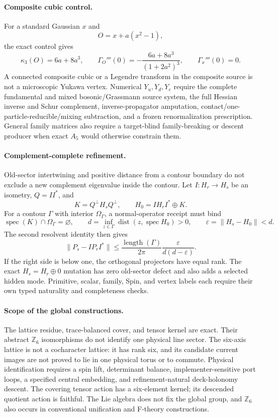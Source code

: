 \documentclass[11pt]{article}
\begin{document}
\paragraph{Composite cubic control.}
For a standard Gaussian \(x\) and
\[
O=x+a(x^2-1),
\]
the exact control gives
\[
\kappa_3(O)=6a+8a^3,\qquad
\Gamma_O'''(0)=-\frac{6a+8a^3}{(1+2a^2)^3},\qquad
\Gamma_x'''(0)=0.
\]
A connected composite cubic or a Legendre transform in the composite source
is not a microscopic Yukawa vertex. Numerical \(Y_u,Y_d,Y_e\) require the
complete fundamental and mixed bosonic/Grassmann source system, the full
Hessian inverse and Schur complement, inverse-propagator amputation,
contact/one-particle-reducible/mixing subtraction, and a frozen
renormalization prescription. General family matrices also require a
target-blind family-breaking or descent producer when exact \(A_5\) would
otherwise constrain them.

\paragraph{Complement-complete refinement.}
Old-sector intertwining and positive distance from a contour boundary do not
exclude a new complement eigenvalue inside the contour. Let \(I:H_r\to H_s\)
be an isometry, \(Q=II^*\), and
\[
K=Q^\perp H_sQ^\perp,\qquad H_0=IH_rI^*\oplus K.
\]
For a contour \(\Gamma\) with interior \(\Omega_\Gamma\), a normal-operator
receipt must bind
\[
\operatorname{spec}(K)\cap\Omega_\Gamma=\varnothing,\qquad
d=\inf_{z\in\Gamma}\operatorname{dist}(z,\operatorname{spec}H_0)>0,
\qquad
\varepsilon=\|H_s-H_0\|<d.
\]
The second resolvent identity then gives
\[
\|P_s-IP_rI^*\|
\le \frac{\operatorname{length}(\Gamma)}{2\pi}
\frac{\varepsilon}{d(d-\varepsilon)}.
\]
If the right side is below one, the orthogonal projectors have equal rank.
The exact \(H_s=H_r\oplus0\) mutation has zero old-sector defect and also
adds a selected hidden mode. Primitive, scalar, family, Spin, and vertex
labels each require their own typed naturality and completeness checks.

\paragraph{Scope of the global constructions.} The lattice residue,
trace-balanced cover, and tensor kernel are exact. Their abstract
\(\mathbb Z_6\) isomorphisms do not identify one physical line sector. The
six-axis lattice is not a cocharacter lattice: it has rank six, and its
candidate current images are not proved to lie in one physical torus or to
commute. Physical identification requires a spin lift,
determinant balance, implementer-sensitive port loops, a specified central
embedding, and refinement-natural deck-holonomy descent. The covering tensor
action has a six-element kernel; its descended quotient action is faithful.
The Lie algebra does not fix the global group, and \(\mathbb Z_6\) also occurs
in conventional unification and F-theory constructions.
\end{document}
